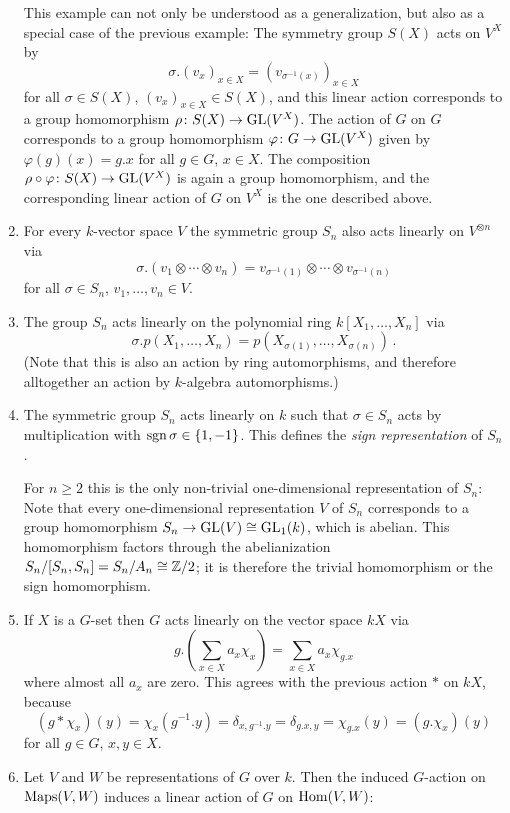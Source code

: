\begin{example}
\begin{enumerate}
      This example can not only be understood as a generalization, but also as a special case of the previous example:
      The symmetry group $S(X)$ acts on $V^X$ by
      \[
          \sigma . (v_x)_{x \in X}
        = (v_{\sigma^{-1}(x)})_{x \in X}
      \]
      for all $\sigma \in S(X)$, $(v_x)_{x \in X} \in S(X)$, and this linear action corresponds to a group homomorphism $\rho \colon S(X) \to \operatorname{GL}(V^X)$.
      The action of $G$ on $G$ corresponds to a group homomorphism $\varphi \colon G \to \operatorname{GL}(V^X)$ given by $\varphi(g)(x) = g.x$ for all $g \in G$, $x \in X$.
      The composition $\rho \circ \varphi \colon S(X) \to \operatorname{GL}(V^X)$ is again a group homomorphism, and the corresponding linear action of $G$ on $V^X$ is the one described above.
    \item
      For every $k$-vector space $V$ the symmetric group $S_n$ also acts linearly on $V^{\otimes n}$ via
      \[
          \sigma.(v_1 \otimes \dotsb \otimes v_n)
        = v_{\sigma^{-1}(1)} \otimes \dotsb \otimes v_{\sigma^{-1}(n)}
      \]
      for all $\sigma \in S_n$, $v_1, \dotsc, v_n \in V$.
    \item
      The group $S_n$ acts linearly on the polynomial ring $k[X_1, \dotsc, X_n]$ via
      \[
          \sigma.p(X_1, \dotsc, X_n)
        = p(X_{\sigma(1)}, \dotsc, X_{\sigma(n)}) \,.
      \]
      (Note that this is also an action by ring automorphisms, and therefore alltogether an action by $k$-algebra automorphisms.)
    \item
      The symmetric group $S_n$ acts linearly on $k$ such that $\sigma \in S_n$ acts by multiplication with $\operatorname{sgn} \sigma \in \{1, -1\}$.
      This defines the \emph{sign representation} of $S_n$.
      
      For $n \geq 2$ this is the only non-trivial one-dimensional representation of $S_n$:
      Note that every one-dimensional representation $V$ of $S_n$ corresponds to a group homomorphism $S_n \to \operatorname{GL}(V) \cong \operatorname{GL}_1(k)$, which is abelian.
      This homomorphism factors through the abelianization $S_n/[S_n, S_n] = S_n/A_n \cong \mathbb{Z}/2$; it is therefore the trivial homomorphism or the sign homomorphism.
    \item
      If $X$ is a $G$-set then $G$ acts linearly on the vector space $kX$ via
      \[
          g.\left(\sum_{x \in X} a_x \chi_x\right)
        = \sum_{x \in X} a_x \chi_{g.x}
      \]
      where almost all $a_x$ are zero.
      This agrees with the previous action $*$ on $kX$, because
      \[
          (g * \chi_x)(y)
        = \chi_x(g^{-1}.y)
        = \delta_{x, g^{-1}.y}
        = \delta_{g.x, y}
        = \chi_{g.x}(y)
        = (g.\chi_x)(y)
      \]
      for all $g \in G$, $x, y \in X$.
    \item
      Let $V$ and $W$ be representations of $G$ over $k$.
      Then the induced $G$-action on $\operatorname{Maps}(V,W)$ induces a linear action of $G$ on $\operatorname{Hom}(V,W)$:
      

\end{enumerate}
\end{example}
